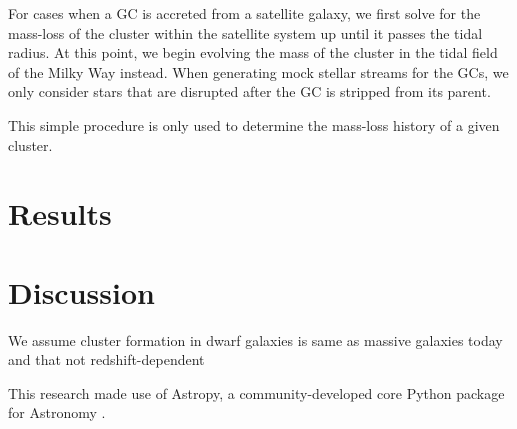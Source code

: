 \documentclass[manuscript, letterpaper]{aastex6}
\begin{document}
For cases when a GC is accreted from a satellite galaxy, we first solve for
the mass-loss of the cluster within the satellite system up until it passes the
tidal radius.
At this point, we begin evolving the mass of the cluster in the tidal field of
the Milky Way instead.
When generating mock stellar streams for the GCs, we only consider stars that
are disrupted after the GC is stripped from its parent.

This simple procedure is only used to determine the mass-loss history of a given
cluster.

\section{Results}

\subsection{}

\section{Discussion}\label{sec:discussion}

We assume cluster formation in dwarf galaxies is same as massive galaxies today
and that not redshift-dependent

\acknowledgements
This research made use of
Astropy, a community-developed core Python package for Astronomy
\citep{Astropy-Collaboration:2013}.



\end{document}
